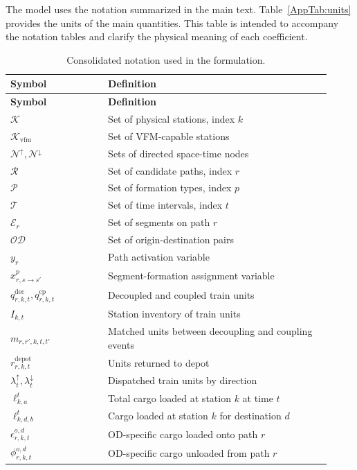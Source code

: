 \documentclass[11pt]{article}
\begin{document}
The model uses the notation summarized in the main text. Table~\ref{AppTab:units} provides the units of the main quantities. This table is intended to accompany the notation tables and clarify the physical meaning of each coefficient.

\begin{longtable}{p{0.28\linewidth}p{0.64\linewidth}}
\caption{Consolidated notation used in the formulation.}
\label{AppTab:notation}\\
\toprule
\textbf{Symbol} & \textbf{Definition} \\
\midrule
\endfirsthead
\toprule
\textbf{Symbol} & \textbf{Definition} \\
\midrule
\endhead
$\mathcal{K}$ & Set of physical stations, index $k$ \\
$\mathcal{K}_{\mathrm{vfm}}$ & Set of VFM-capable stations \\
$\mathcal{N}^{\uparrow}, \mathcal{N}^{\downarrow}$ & Sets of directed space-time nodes \\
$\mathcal{R}$ & Set of candidate paths, index $r$ \\
$\mathcal{P}$ & Set of formation types, index $p$ \\
$\mathcal{T}$ & Set of time intervals, index $t$ \\
$\mathcal{E}_r$ & Set of segments on path $r$ \\
$\mathcal{OD}$ & Set of origin-destination pairs \\
$y_r$ & Path activation variable \\
$x_{r,s\to s'}^{p}$ & Segment-formation assignment variable \\
$q_{r,k,t}^{\mathrm{dec}}, q_{r,k,t}^{\mathrm{cp}}$ & Decoupled and coupled train units \\
$I_{k,t}$ & Station inventory of train units \\
$m_{r,r',k,t,t'}$ & Matched units between decoupling and coupling events \\
$r_{r,k,t}^{\mathrm{depot}}$ & Units returned to depot \\
$\lambda_t^{\uparrow}, \lambda_t^{\downarrow}$ & Dispatched train units by direction \\
$\ell_{k,a}^{t}$ & Total cargo loaded at station $k$ at time $t$ \\
$\ell_{k,d,b}^{t}$ & Cargo loaded at station $k$ for destination $d$ \\
$\epsilon_{r,k,t}^{o,d}$ & OD-specific cargo loaded onto path $r$ \\
$\phi_{r,k,t}^{o,d}$ & OD-specific cargo unloaded from path $r$ \\

\end{longtable}
\end{document}
